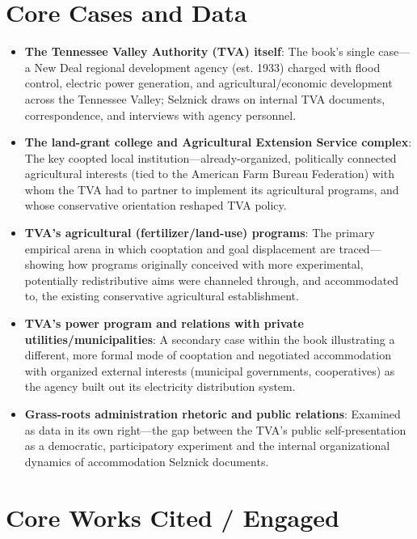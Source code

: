 \documentclass[12pt]{article}
\begin{document}
\section{Core Cases and Data}

\begin{itemize}[leftmargin=*, itemsep=4pt]
    \item \textbf{The Tennessee Valley Authority (TVA) itself}: The book's single case---a New Deal regional development agency (est. 1933) charged with flood control, electric power generation, and agricultural/economic development across the Tennessee Valley; Selznick draws on internal TVA documents, correspondence, and interviews with agency personnel.
    \item \textbf{The land-grant college and Agricultural Extension Service complex}: The key coopted local institution---already-organized, politically connected agricultural interests (tied to the American Farm Bureau Federation) with whom the TVA had to partner to implement its agricultural programs, and whose conservative orientation reshaped TVA policy.
    \item \textbf{TVA's agricultural (fertilizer/land-use) programs}: The primary empirical arena in which cooptation and goal displacement are traced---showing how programs originally conceived with more experimental, potentially redistributive aims were channeled through, and accommodated to, the existing conservative agricultural establishment.
    \item \textbf{TVA's power program and relations with private utilities/municipalities}: A secondary case within the book illustrating a different, more formal mode of cooptation and negotiated accommodation with organized external interests (municipal governments, cooperatives) as the agency built out its electricity distribution system.
    \item \textbf{Grass-roots administration rhetoric and public relations}: Examined as data in its own right---the gap between the TVA's public self-presentation as a democratic, participatory experiment and the internal organizational dynamics of accommodation Selznick documents.
\end{itemize}

\section{Core Works Cited / Engaged}
\end{document}
